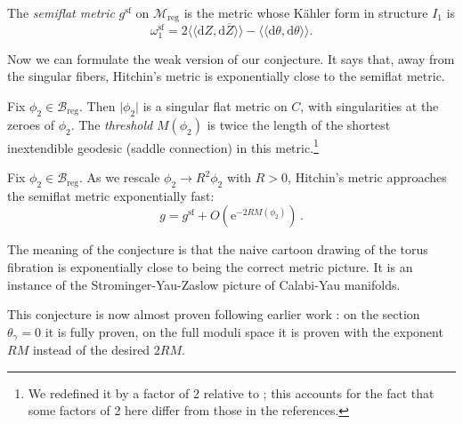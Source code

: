 \documentclass[12pt,letterpaper,reqno]{article}
\numberwithin{equation}{section}
\begin{document}
\begin{defn}
The \textit{semiflat metric}  $g^{\mathrm{sf}}$ on $\mathcal M_\mathrm{reg}$ is the metric 
whose K\"ahler form in structure $I_1$ is
\begin{equation} \label{eq:omega1-sf}
  \omega^{\mathrm{sf}}_1 = 2 \langle\!\langle \mathrm{d} Z, \mathrm{d} \overline{Z} \rangle\!\rangle - \langle\!\langle \mathrm{d} \theta, \mathrm{d} \theta \rangle\!\rangle.
\end{equation}
\end{defn}                                   

Now we can formulate the weak version of our conjecture.
It says that, away from the singular fibers, Hitchin's
metric is exponentially close to the semiflat metric.

\begin{defn}[Threshold]
Fix $\phi_2 \in \mathcal B_\mathrm{reg}$. Then $\lvert \phi_2 \rvert$ is a singular flat metric on $C$, with singularities at the
zeroes of $\phi_2$. The \textit{threshold} $M(\phi_2)$
is twice the length of the shortest inextendible geodesic
(saddle connection) in this metric.\footnote{We redefined it by a factor of 2 relative to \cite{dumas2019asymptotics}; this accounts for the fact
that some factors of 2 here differ from those in the references.}
\end{defn}

\begin{conj} \label{conj:weak-metric}
Fix $\phi_2 \in \mathcal B_\mathrm{reg}$.
As we rescale $\phi_2 \to R^2 \phi_2$ with $R > 0$,
Hitchin's metric approaches the semiflat metric
exponentially fast:
\begin{equation}
  g = g^{\mathrm{sf}} + O(\mathrm e^{-2 R M(\phi_2)}) \, .
\end{equation}
\end{conj}

The meaning of the conjecture is that the naive cartoon drawing of the
torus fibration is exponentially close to being the correct metric picture.
It is an instance of the Strominger-Yau-Zaslow picture of Calabi-Yau
manifolds.

This conjecture is now almost proven
\cite{mochizuki2024comparison} following earlier 
work \cite{mazzeo2019asymptotic,dumas2019asymptotics,fredrickson2020exponential}: on
the section $\theta_\gamma = 0$
it is fully proven, on the full moduli space
it is proven with the exponent $RM$ instead
of the desired $2RM$.
\end{document}
